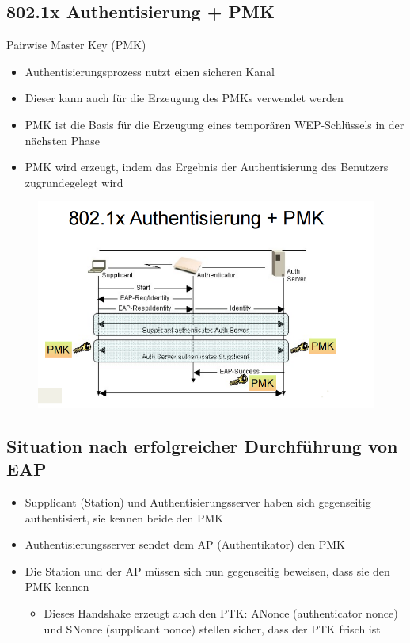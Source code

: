 \documentclass[openany]{book}
\begin{document}
\subsection{802.1x Authentisierung + PMK}

Pairwise Master Key (PMK)

\begin{itemize}
    \item Authentisierungsprozess nutzt einen sicheren Kanal
    \item Dieser kann auch für die Erzeugung des PMKs verwendet werden
    \item PMK ist die Basis für die Erzeugung eines temporären WEP-Schlüssels in der nächsten Phase
    \item PMK wird erzeugt, indem das Ergebnis der Authentisierung des Benutzers zugrundegelegt wird
\end{itemize}

\newpage

\begin{figure}[h!]
    \centering
    \includegraphics[width=\linewidth]{Pics/802.1XAuthentication.PNG}
\end{figure}

\subsection{Situation nach erfolgreicher Durchführung von EAP}

\begin{itemize}
    \item Supplicant (Station) und Authentisierungsserver haben sich gegenseitig authentisiert, sie kennen beide den PMK
    \item Authentisierungsserver sendet dem AP (Authentikator) den PMK
    \item Die Station und der AP müssen sich nun gegenseitig beweisen, dass sie den PMK kennen
    \begin{itemize}
        \item Dieses Handshake erzeugt auch den PTK: ANonce (authenticator nonce) und SNonce (supplicant nonce) stellen sicher, dass der PTK frisch ist
    \end{itemize}
\end{itemize}
\end{document}

